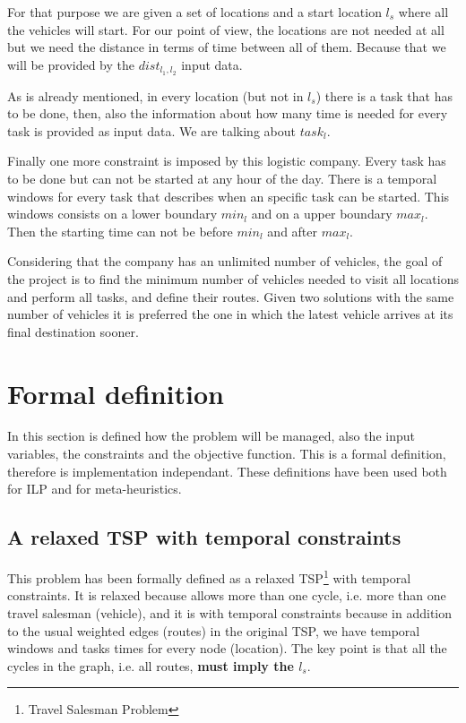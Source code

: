 \documentclass[]{report}
\begin{document}
For that purpose we are given a set of locations and a start location $l_{s}$ where all the vehicles will start. For our point of view, the locations are not needed at all but we need the distance in terms of time between all of them. Because that we will be provided by the $dist_{l_{1},l_{2}}$ input data.

As is already mentioned, in every location (but not in $l_{s}$) there is a task that has to be done, then, also the information about how many time is needed for every task is provided as input data. We are talking about $task_{l}$.

Finally one more constraint is imposed by this logistic company. Every task has to be done but can not be started at any hour of the day. There is a temporal windows for every task that describes when an specific task can be started. This windows consists on a lower boundary $min_{l}$ and on a upper boundary $max_{l}$. Then the starting time can not be before $min_{l}$ and after $max_{l}$.

Considering that the company has an unlimited number of vehicles, the goal of the project is to find the minimum number of vehicles needed to visit all locations and perform all tasks, and define their routes. Given two solutions with the same number of vehicles it is preferred the one in which the latest vehicle arrives at its final destination sooner.

\section{Formal definition}

In this section is defined how the problem will be managed, also the input variables, the constraints and the objective function. This is a formal definition, therefore is implementation independant. These definitions have been used both for ILP and for meta-heuristics.

\subsection{A relaxed TSP with temporal constraints}\label{ss:relased_tsp}

This problem has been formally defined as a relaxed TSP\footnote{Travel Salesman Problem} with temporal constraints. It is relaxed because allows more than one cycle, i.e. more than one travel salesman (vehicle), and it is with temporal constraints because in addition to the usual weighted edges (routes) in the original TSP, we have temporal windows and tasks times for every node (location). The key point is that all the cycles in the graph, i.e. all routes, \textbf{must imply the $l_{s}$}.
\end{document}
